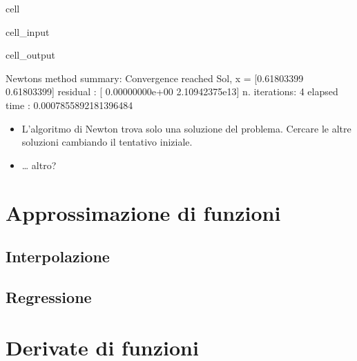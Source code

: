 \documentclass[letterpaper,10pt,english]{jupyterBook}
\begin{document}
\begin{sphinxuseclass}{cell}
\begin{sphinxVerbatimInput}
\begin{sphinxuseclass}{cell_input}
\end{sphinxuseclass}\end{sphinxVerbatimInput}
\begin{sphinxVerbatimOutput}

\begin{sphinxuseclass}{cell_output}
\begin{sphinxVerbatim}[commandchars=\\\{\}]
Newton\PYGZsq{}s method summary: 
Convergence reached
Sol, x = [\PYGZhy{}0.61803399 \PYGZhy{}0.61803399]
residual     : [ 0.00000000e+00 \PYGZhy{}2.10942375e\PYGZhy{}13]
n. iterations: 4
elapsed time : 0.0007855892181396484
\end{sphinxVerbatim}

\end{sphinxuseclass}\end{sphinxVerbatimOutput}

\end{sphinxuseclass}\begin{itemize}
\item {} 
\sphinxAtStartPar
{} L’algoritmo di Newton trova solo una soluzione del problema. Cercare le altre soluzioni cambiando il tentativo iniziale.

\item {} 
\sphinxAtStartPar
{} … altro?

\end{itemize}

\sphinxstepscope


\section{Approssimazione di funzioni}
\label{\detokenize{ch/numerics/approximation:approssimazione-di-funzioni}}\label{\detokenize{ch/numerics/approximation::doc}}

\subsection{Interpolazione}
\label{\detokenize{ch/numerics/approximation:interpolazione}}

\subsection{Regressione}
\label{\detokenize{ch/numerics/approximation:regressione}}
\sphinxstepscope


\section{Derivate di funzioni}
\label{\detokenize{ch/numerics/derivatives:derivate-di-funzioni}}\label{\detokenize{ch/numerics/derivatives::doc}}
\end{document}
